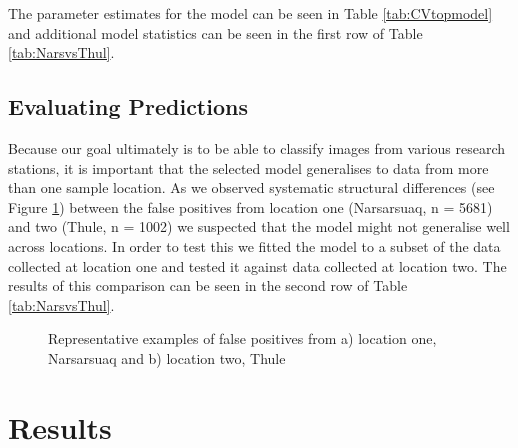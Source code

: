 \documentclass[12pt]{article}
\begin{document}
The parameter estimates for the model can be seen in Table \ref{tab:CVtopmodel} and additional model statistics can be seen in the first row of Table \ref{tab:NarsvsThul}.

\subsection{Evaluating Predictions}\label{modeleval}
Because our goal ultimately is to be able to classify images from various research stations, it is important that the selected model generalises to data from more than one sample location. As we observed systematic structural differences (see Figure \ref{fig:falsepositives}) between the false positives from location one (Narsarsuaq, n = 5681) and two (Thule, n = 1002) we suspected that the model might not generalise well across locations. In order to test this we fitted the model to a subset of the data collected at location one and tested it against data collected at location two. The results of this comparison can be seen in the second row of Table \ref{tab:NarsvsThul}.

\begin{figure}[ht]
	\begin{center}
		\hfill
		\caption{Representative examples of false positives from a) location one, Narsarsuaq and b) location two, Thule} 
		\label{fig:falsepositives}
	\end{center}
\end{figure}


\section{Results}
\end{document}
